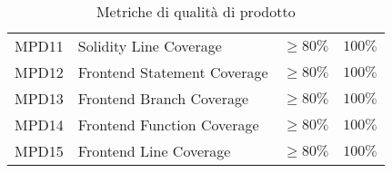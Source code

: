 \begin{table}[H]
\begin{tabular}{c|p{6cm}|c|c}
    MPD11 & Solidity Line Coverage                                        & $\ge 80\%$ & $100\%$    \\
    MPD12 & Frontend Statement Coverage                                   & $\ge 80\%$ & $100\%$    \\
    MPD13 & Frontend Branch Coverage                                      & $\ge 80\%$ & $100\%$    \\
    MPD14 & Frontend Function Coverage                                    & $\ge 80\%$ & $100\%$    \\
    MPD15 & Frontend Line Coverage                                        & $\ge 80\%$ & $100\%$    \\
  \end{tabular}
  \caption{Metriche di qualità di prodotto}
\end{table}

